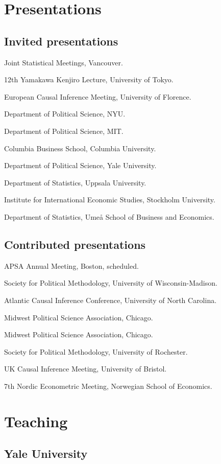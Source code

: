 \documentclass[10pt,letterpaper]{article}
\newenvironment{singledatelist}{
	\begin{list}{}{
		\setlength{\parskip}{0pt}
		\setlength{\itemsep}{4pt}
		\setlength{\parsep}{0.3em}
		\setlength{\leftmargin}{5em}
		\setlength{\labelwidth}{6em}
		\setlength{\labelsep}{1.5em}
		}
	}{
\end{list}
}
\newcommand{\dateitem}[2][]{\item[{#1}] {#2}}
\begin{document}
	\section*{Presentations}

	\subsection*{Invited presentations}

	\begin{singledatelist}
		\dateitem[2018]{Joint Statistical Meetings, Vancouver.}
		\dateitem{12th Yamakawa Kenjiro Lecture, University of Tokyo.}
		\dateitem{European Causal Inference Meeting, University of Florence.}
		\dateitem{Department of Political Science, NYU.}
		\dateitem{Department of Political Science, MIT.}
		\dateitem[2016]{Columbia Business School, Columbia University.}
		\dateitem[2015]{Department of Political Science, Yale University.}
		\dateitem{Department of Statistics, Uppsala University.}
		\dateitem{Institute for International Economic Studies, Stockholm University.}
		\dateitem[2013]{Department of Statistics, Umeå School of Business and Economics.}
	\end{singledatelist}


	\subsection*{Contributed presentations}

	\begin{singledatelist}
		\dateitem[2018]{APSA Annual Meeting, Boston, scheduled.}
		\dateitem[2017]{Society for Political Methodology, University of Wisconsin-Madison.}
		\dateitem{Atlantic Causal Inference Conference, University of North Carolina.}
		\dateitem{Midwest Political Science Association, Chicago.}
		\dateitem[2016]{Midwest Political Science Association, Chicago.}
		\dateitem[2015]{Society for Political Methodology, University of Rochester.}
		\dateitem{UK Causal Inference Meeting, University of Bristol.}
		\dateitem[2013]{7th Nordic Econometric Meeting, Norwegian School of Economics.}
	\end{singledatelist}


	\section*{Teaching}

	\subsection*{Yale University}
\end{document}
